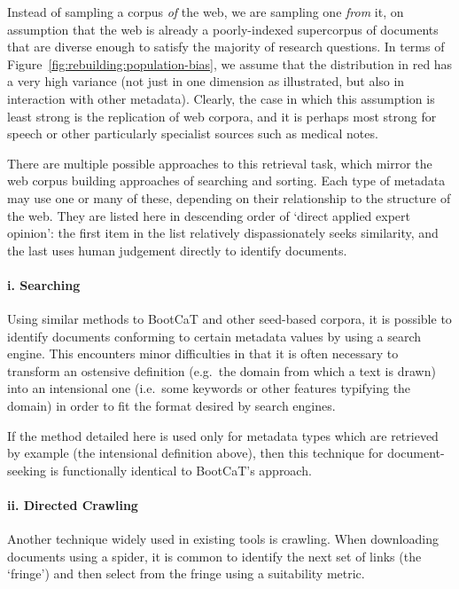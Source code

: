 Instead of sampling a corpus \textsl{of} the web, we are sampling one \textsl{from} it, on assumption that the web is already a poorly-indexed supercorpus of documents that are diverse enough to satisfy the majority of research questions.  In terms of Figure~\ref{fig:rebuilding:population-bias}, we assume that the distribution in red has a very high variance (not just in one dimension as illustrated, but also in interaction with other metadata).  Clearly, the case in which this assumption is least strong is the replication of web corpora, and it is perhaps most strong for speech or other particularly specialist sources such as medical notes.


There are multiple possible approaches to this retrieval task, which mirror the web corpus building approaches of searching and sorting.  Each type of metadata may use one or many of these, depending on their relationship to the structure of the web.  They are listed here in descending order of `direct applied expert opinion': the first item in the list relatively dispassionately seeks similarity, and the last uses human judgement directly to identify documents.



\paragraph{i. Searching}
\label{sec:rebuilding:design:searching}
Using similar methods to BootCaT and other seed-based corpora, it is possible to identify documents conforming to certain metadata values by using a search engine.  This encounters minor difficulties in that it is often necessary to transform an ostensive definition (e.g.\ the domain from which a text is drawn) into an intensional one (i.e.\ some keywords or other features typifying the domain) in order to fit the format desired by search engines.

If the method detailed here is used only for metadata types which are retrieved by example (the intensional definition above), then this technique for document-seeking is functionally identical to BootCaT's approach.



\paragraph{ii. Directed Crawling}
Another technique widely used in existing tools is crawling.  When downloading documents using a spider, it is common to identify the next set of links (the `fringe') and then select from the fringe using a suitability metric.


